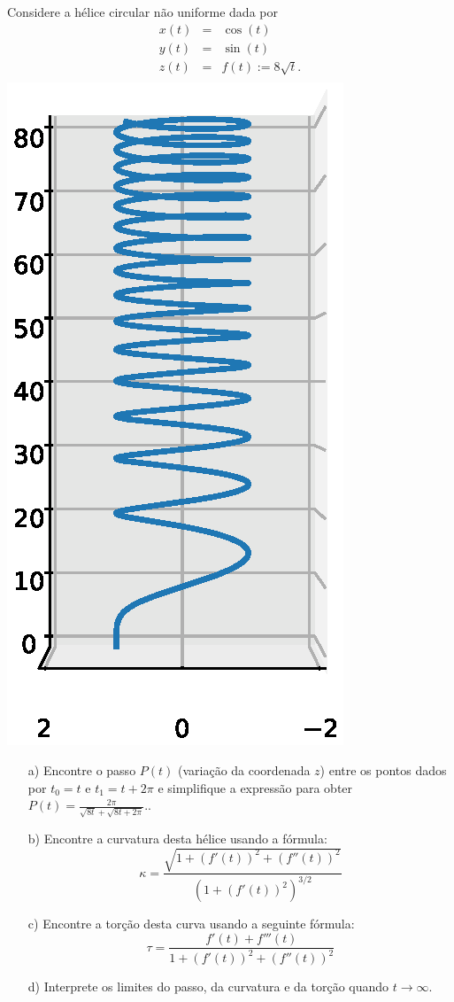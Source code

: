 \begin{exeresol}  Considere a hélice circular não uniforme dada por
  \begin{eqnarray*}
    x(t)&=&\cos(t)\\
    y(t)&=&\sin(t)\\
    z(t)&=&f(t):=8\sqrt{t}.\\
  \end{eqnarray*}
  \includegraphics[scale=.6]{./cap_curvas/figs/helice_sqrt_z}
  \begin{itemize}
    \item[a)] Encontre o passo $P(t)$ (variação da coordenada $z$) entre os pontos dados por $t_0=t$ e $t_1=t+2\pi$ e simplifique a expressão para obter $P(t)=\frac{2\pi}{\sqrt{8t} + \sqrt{8t+2\pi}}.$.
  \item[b)] Encontre  a curvatura desta hélice usando a fórmula:
  $$\kappa=\frac{\sqrt{1+\left(f'(t)\right)^2+\left(f''(t)\right)^2}}{\left({1+\left(f'(t)\right)^2}\right)^{3/2}}$$
    \item[c)] Encontre a torção desta curva usando a seguinte fórmula:
    $$\tau=\frac{f'(t)+f'''(t)}{1+\left(f'(t)\right)^2+\left(f''(t)\right)^2}$$
    \item[d)] Interprete os limites do passo, da curvatura e da torção quando $t\to \infty$.
    \end{itemize}
  \end{exeresol}
